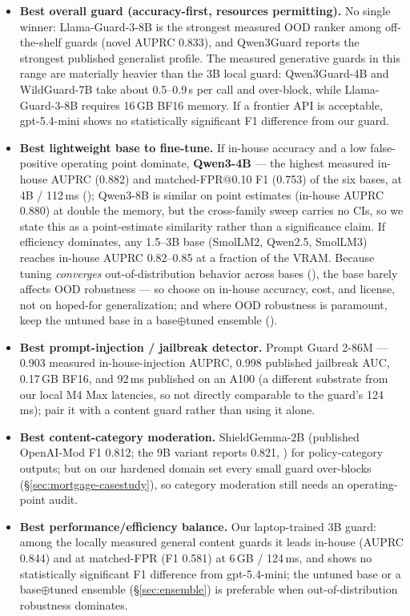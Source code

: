 \begin{itemize}
  \item \textbf{Best overall guard (accuracy-first, resources permitting).} No single winner: Llama-Guard-3-8B is the strongest measured OOD ranker among off-the-shelf guards (novel AUPRC 0.833), and Qwen3Guard reports the strongest published generalist profile. The measured generative guards in this range are materially heavier than the 3B local guard: Qwen3Guard-4B and WildGuard-7B take about 0.5--0.9\,s per call and over-block, while Llama-Guard-3-8B requires 16\,GB BF16 memory. If a frontier API is acceptable, gpt-5.4-mini shows no statistically significant F1 difference from our guard.
  \item \textbf{Best lightweight base to fine-tune.} If in-house accuracy and a low false-positive operating point dominate, \textbf{Qwen3-4B} --- the highest measured in-house AUPRC (0.882) and matched-FPR@0.10 F1 (0.753) of the six bases, at 4B / 112\,ms (); Qwen3-8B is similar on point estimates (in-house AUPRC 0.880) at double the memory, but the cross-family sweep carries no CIs, so we state this as a point-estimate similarity rather than a significance claim. If efficiency dominates, any 1.5--3B base (SmolLM2, Qwen2.5, SmolLM3) reaches in-house AUPRC 0.82--0.85 at a fraction of the VRAM. Because tuning \emph{converges} out-of-distribution behavior across bases (), the base barely affects OOD robustness --- so choose on in-house accuracy, cost, and license, not on hoped-for generalization; and where OOD robustness is paramount, keep the untuned base in a base$\oplus$tuned ensemble ().
  \item \textbf{Best prompt-injection / jailbreak detector.} Prompt Guard 2-86M --- 0.903 measured in-house-injection AUPRC, 0.998 published jailbreak AUC, 0.17\,GB BF16, and 92\,ms published on an A100 (a different substrate from our local M4 Max latencies, so not directly comparable to the guard's 124\,ms); pair it with a content guard rather than using it alone.
  \item \textbf{Best content-category moderation.} ShieldGemma-2B (published OpenAI-Mod F1 0.812; the 9B variant reports 0.821, ) for policy-category outputs; but on our hardened domain set every small guard over-blocks (\S\ref{sec:mortgage-casestudy}), so category moderation still needs an operating-point audit.
  \item \textbf{Best performance/efficiency balance.} Our laptop-trained 3B guard: among the locally measured general content guards it leads in-house (AUPRC 0.844) and at matched-FPR (F1 0.581) at 6\,GB / 124\,ms, and shows no statistically significant F1 difference from gpt-5.4-mini; the untuned base or a base$\oplus$tuned ensemble (\S\ref{sec:ensemble}) is preferable when out-of-distribution robustness dominates.

\end{itemize}
